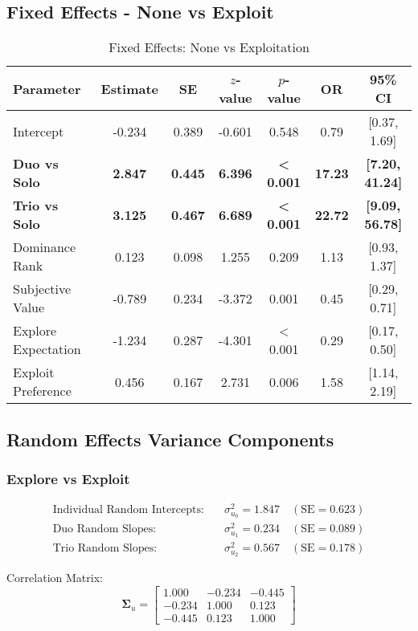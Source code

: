 \documentclass[11pt,a4paper]{article}
\begin{document}
\subsection{Fixed Effects - None vs Exploit}

\begin{table}[H]
\centering
\caption{Fixed Effects: None vs Exploitation}
\begin{tabular}{lcccccc}
\toprule
Parameter & Estimate & SE & $z$-value & $p$-value & OR & 95\% CI \\
\midrule
Intercept & -0.234 & 0.389 & -0.601 & 0.548 & 0.79 & [0.37, 1.69] \\
\textbf{Duo vs Solo} & \textbf{2.847} & \textbf{0.445} & \textbf{6.396} & \textbf{< 0.001} & \textbf{17.23} & \textbf{[7.20, 41.24]} \\
\textbf{Trio vs Solo} & \textbf{3.125} & \textbf{0.467} & \textbf{6.689} & \textbf{< 0.001} & \textbf{22.72} & \textbf{[9.09, 56.78]} \\
Dominance Rank & 0.123 & 0.098 & 1.255 & 0.209 & 1.13 & [0.93, 1.37] \\
Subjective Value & -0.789 & 0.234 & -3.372 & 0.001 & 0.45 & [0.29, 0.71] \\
Explore Expectation & -1.234 & 0.287 & -4.301 & < 0.001 & 0.29 & [0.17, 0.50] \\
Exploit Preference & 0.456 & 0.167 & 2.731 & 0.006 & 1.58 & [1.14, 2.19] \\
\bottomrule
\end{tabular}
\end{table}

\subsection{Random Effects Variance Components}

\subsubsection{Explore vs Exploit}
\begin{align}
\text{Individual Random Intercepts:} &\quad \sigma_{u_0}^2 = 1.847 \quad (\text{SE} = 0.623)\\
\text{Duo Random Slopes:} &\quad \sigma_{u_1}^2 = 0.234 \quad (\text{SE} = 0.089)\\
\text{Trio Random Slopes:} &\quad \sigma_{u_2}^2 = 0.567 \quad (\text{SE} = 0.178)
\end{align}

Correlation Matrix:
\begin{equation}
\boldsymbol{\Sigma}_u = \begin{bmatrix}
1.000 & -0.234 & -0.445 \\
-0.234 & 1.000 & 0.123 \\
-0.445 & 0.123 & 1.000
\end{bmatrix}
\end{equation}
\end{document}
